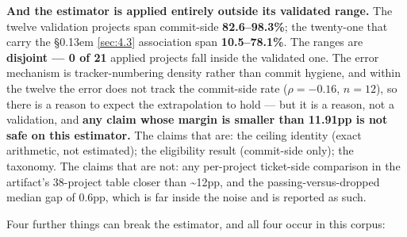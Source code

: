\documentclass[sigconf,review,anonymous]{acmart}
\begin{document}
\textbf{And the estimator is applied entirely outside its validated range.} The twelve validation projects span commit-side \textbf{82.6--98.3\%}; the twenty-one that carry the \S\kern0.13em \ref{sec:4.3} association span \textbf{10.5--78.1\%}. The ranges are \textbf{disjoint --- 0 of 21} applied projects fall inside the validated one. The error mechanism is tracker-numbering density rather than commit hygiene, and within the twelve the error does not track the commit-side rate ($\rho = -0.16$, $n = 12$), so there is a reason to expect the extrapolation to hold --- but it is a reason, not a validation, and \textbf{any claim whose margin is smaller than 11.91pp is not safe on this estimator.} The claims that are: the ceiling identity (exact arithmetic, not estimated); the eligibility result (commit-side only); the taxonomy. The claims that are not: any per-project ticket-side comparison in the artifact's 38-project table closer than \textasciitilde{}12pp, and the passing-versus-dropped median gap of 0.6pp, which is far inside the noise and is reported as such.

Four further things can break the estimator, and all four occur in this corpus:
\end{document}
